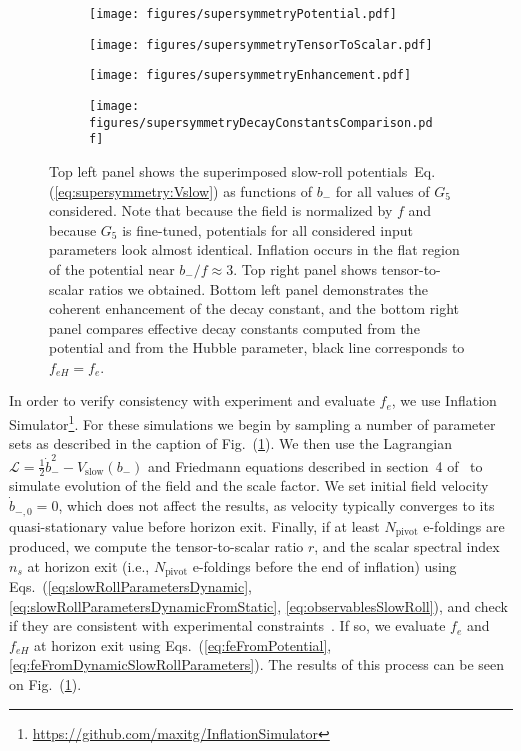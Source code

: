 \documentclass[12pt]{article}
\begin{document}
\begin{figure}
  \centering
  \begin{subfigure}{0.45 \textwidth}
    \texttt{[image: figures/supersymmetryPotential.pdf]}
  \end{subfigure}
  \begin{subfigure}{0.45 \textwidth}
    \texttt{[image: figures/supersymmetryTensorToScalar.pdf]}
  \end{subfigure}
  \begin{subfigure}{0.45 \textwidth}
    \texttt{[image: figures/supersymmetryEnhancement.pdf]}
  \end{subfigure}
  \begin{subfigure}{0.45 \textwidth}
    \texttt{[image: figures/supersymmetryDecayConstantsComparison.pdf]}
  \end{subfigure}
  \caption{\protect
    Top left panel shows the superimposed slow-roll potentials~Eq.(\ref{eq:supersymmetry:Vslow}) as functions of $b_-$ for all values of $G_5$ considered.
    Note that because the field is normalized by $f$ and because $G_5$ is fine-tuned, potentials for all considered input parameters look almost identical.
    Inflation occurs in the flat region of the potential near $b_- / f \approx 3$.
    Top right panel shows tensor-to-scalar ratios we obtained.
    Bottom left panel demonstrates the coherent enhancement of the decay constant, and the bottom right panel compares effective decay constants computed from the potential and from the Hubble parameter, black line corresponds to $f_{eH} = f_e$.
  } \label{fig:supersymmetry}
\end{figure}

In order to verify consistency with experiment and evaluate $f_e$, we use Inflation Simulator\footnote{\url{https://github.com/maxitg/InflationSimulator}}.
For these simulations we begin by sampling a number of parameter sets as described in the caption of Fig.~(\ref{fig:supersymmetry}).
We then use the Lagrangian $\mathcal{L} = \frac{1}{2} \dot b_-^2 - V_\text{slow}\left(b_-\right)$ and Friedmann equations described in section~4 of~\cite{Nath:2018xxe} to simulate evolution of the field and the scale factor.
We set initial field velocity $\dot b_{-, 0} = 0$, which does not affect the results, as velocity typically converges to its quasi-stationary value before horizon exit.
Finally, if at least $N_\text{pivot}$ e-foldings are produced, we compute the tensor-to-scalar ratio $r$, and the scalar spectral index $n_s$ at horizon exit (i.e., $N_\text{pivot}$ e-foldings before the end of inflation) using Eqs.~(\ref{eq:slowRollParametersDynamic}, \ref{eq:slowRollParametersDynamicFromStatic}, \ref{eq:observablesSlowRoll}), and check if they are consistent with experimental constraints~\cite{Ade:2015lrj}.
If so, we evaluate $f_e$ and $f_{eH}$ at horizon exit using Eqs.~(\ref{eq:feFromPotential}, \ref{eq:feFromDynamicSlowRollParameters}).
The results of this process can be seen on Fig.~(\ref{fig:supersymmetry}).
\end{document}
